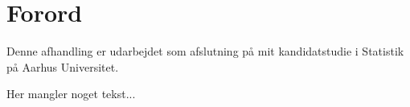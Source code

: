 
\chapter{Forord}
\label{chap:preface}
Denne afhandling er udarbejdet som afslutning på mit kandidatstudie i
Statistik på Aarhus Universitet.

Her mangler noget tekst...